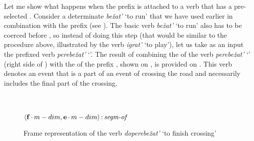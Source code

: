 Let me show what happens when the prefix  is attached to a verb that has a pre-selected . Consider a determinate  \textit{be\v{z}at'} `to run' that we have used earlier in combination with the prefix  (see ). The basic verb \textit{be\v{z}at'} `to run' also has to be coerced before , so instead of doing this step (that would be similar to the procedure above, illustrated by the verb \textit{igrat'} `to play'), let us take as an input the prefixed verb \textit{perebe\v{z}at'} `'. The result of combining the  of the verb \textit{perebe\v{z}at'} `' (right side of ) with the  of the prefix , shown on , is provided on . This verb denotes an event that is a part of an event of crossing the road and necessarily includes the final part of the crossing. 

\begin{figure}
\begin{center}
\\
 \vspace{1em}
\\
 $\langle{\textbf{\textrm{f}}\,{\cdot}\,m-dim,\textbf{\textrm{e}}\,{\cdot}\,m-dim}\rangle\,{:}\,\textit{segm-of}$\\[1ex]
 \end{center}
\caption{Frame representation of the verb \textit{doperebe\v{z}at'} `to finish crossing' \label{frame:do:perebezhat}}
\end{figure}

